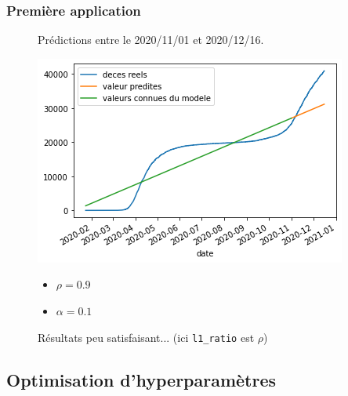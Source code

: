 \documentclass{beamer}[aspectratio = 43]
\begin{document}
\begin{frame}
	\frametitle{Première application}
	\begin{figure}
		Prédictions entre le 2020/11/01 et 2020/12/16.
		\begin{minipage}{0.8\textwidth}
					\includegraphics[scale=0.6]{EN_2020-11-01}
		\end{minipage}%
		\begin{minipage}{0.2\textwidth}
			\begin{itemize}
			\item[] $\rho = 0.9$
			\item[] $\alpha = 0.1$
			\end{itemize}
		\end{minipage}
		\caption{Résultats peu satisfaisant... (ici \texttt{l1\_ratio} est $\rho$)}
	\end{figure}
\end{frame}

\subsection*{Optimisation d'hyperparamètres}
\end{document}
